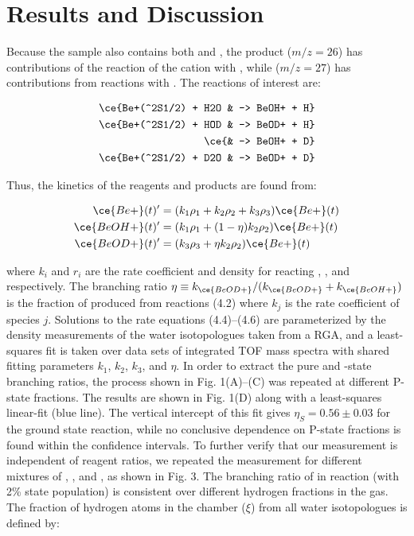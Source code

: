 \section{Results and Discussion}

Because the  sample also contains both  and , the product  ($m/z = 26$) has contributions of the reaction of the cation with , while  ($m/z = 27$) has contributions from reactions with . The reactions of interest are:

\begin{align}
	\ce{Be+(^2S1/2) + H2O & -> BeOH+ + H} \\
	\ce{Be+(^2S1/2) + HOD & -> BeOD+ + H} \\
	\ce{& -> BeOH+ + D} \\
	\ce{Be+(^2S1/2) + D2O & -> BeOD+ + D}
\end{align}

Thus, the kinetics of the reagents and products are found from:

\begin{align}
	\ce{Be+}(t)' & = (k_1 \rho_1 + k_2 \rho_2 + k_3 \rho_3) \ce{Be+}(t) \\
	\ce{BeOH+}(t)' & = (k_1 \rho_1 + (1-\eta)k_2 \rho_2) \ce{Be+}(t) \\
	\ce{BeOD+}(t)' & = (k_3 \rho_3 + \eta k_2 \rho_2) \ce{Be+}(t)
\end{align}

where $k_i$ and $r_i$ are the rate coefficient and density for  reacting , , and  respectively. The branching ratio $\eta \equiv k_{\ce{BeOD+}}/(k_{\ce{BeOD+}} + k_{\ce{BeOH+}})$ is the fraction of  produced from reactions (4.2) where $k_j$ is the rate coefficient of species $j$. Solutions to the rate equations (4.4)–(4.6) are parameterized by the density measurements of the water isotopologues taken from a RGA, and a least-squares fit is taken over data sets of integrated TOF mass spectra with shared fitting parameters $k_1$, $k_2$, $k_3$, and $\eta$. In order to extract the pure  and -state branching ratios, the process shown in Fig. 1(A)–(C) was repeated at different P-state fractions. The results are shown in Fig. 1(D) along with a least-squares linear-fit (blue line). The vertical intercept of this fit gives $\eta_S = 0.56 \pm 0.03$ for the ground  state reaction, while no conclusive dependence on P-state fractions is found within the confidence intervals. To further verify that our measurement is independent of reagent ratios, we repeated the measurement for different mixtures of , , and , as shown in Fig. 3. The branching ratio of  in reaction  (with 2\%  state population) is consistent over different hydrogen fractions in the gas. The fraction of hydrogen atoms in the chamber ($\xi$) from all water isotopologues is defined by:

